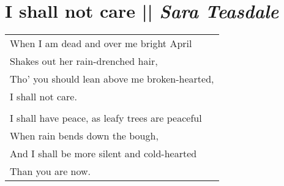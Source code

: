 
\section[I shall not care ]{I shall not care  || \emph{Sara Teasdale} \hspace*{\fill}  \thepage}
\vspace*{3cm}
\begin{center}
\begin{tabular}{l}
When I am dead and over me bright April\\
Shakes out her rain-drenched hair,\\
Tho' you should lean above me broken-hearted,\\
I shall not care.\\
\\I shall have peace, as leafy trees are peaceful\\
When rain bends down the bough,\\
And I shall be more silent and cold-hearted\\
Than you are now.
\end{tabular}
\end{center}